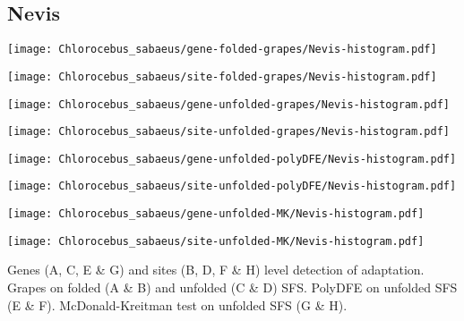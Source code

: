 \documentclass{article}
\begin{document}
\pagebreak
\subsection{Nevis}
\centering
\begin{minipage}{0.49\linewidth}
    \texttt{[image: Chlorocebus\_sabaeus/gene-folded-grapes/Nevis-histogram.pdf]}
\end{minipage}%
\hfill
\begin{minipage}{0.49\linewidth}
    \texttt{[image: Chlorocebus\_sabaeus/site-folded-grapes/Nevis-histogram.pdf]}
\end{minipage}
\hfill
\begin{minipage}{0.49\linewidth}
    \texttt{[image: Chlorocebus\_sabaeus/gene-unfolded-grapes/Nevis-histogram.pdf]}
\end{minipage}%
\hfill
\begin{minipage}{0.49\linewidth}
    \texttt{[image: Chlorocebus\_sabaeus/site-unfolded-grapes/Nevis-histogram.pdf]}
\end{minipage}
\hfill
\begin{minipage}{0.49\linewidth}
    \texttt{[image: Chlorocebus\_sabaeus/gene-unfolded-polyDFE/Nevis-histogram.pdf]}
\end{minipage}%
\hfill
\begin{minipage}{0.49\linewidth}
    \texttt{[image: Chlorocebus\_sabaeus/site-unfolded-polyDFE/Nevis-histogram.pdf]}
\end{minipage}
\hfill
\begin{minipage}{0.49\linewidth}
    \texttt{[image: Chlorocebus\_sabaeus/gene-unfolded-MK/Nevis-histogram.pdf]}
\end{minipage}%
\hfill
\begin{minipage}{0.49\linewidth}
    \texttt{[image: Chlorocebus\_sabaeus/site-unfolded-MK/Nevis-histogram.pdf]}
\end{minipage}
\hfill
\flushleft
Genes (A, C, E \& G) and sites (B, D, F \& H) level detection of adaptation.
Grapes on folded (A \& B) and unfolded (C \& D) SFS.
PolyDFE on unfolded SFS (E \& F).
McDonald-Kreitman test on unfolded SFS (G \& H).
\end{document}
